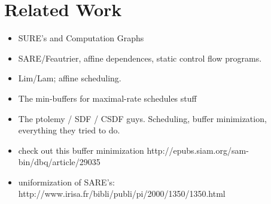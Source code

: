 \section{Related Work}

\begin{itemize}

\item SURE's and Computation Graphs

\item SARE/Feautrier, affine dependences, static control flow programs.

\item Lim/Lam; affine scheduling.

\item The min-buffers for maximal-rate schedules stuff

\item The ptolemy / SDF / CSDF guys.  Scheduling, buffer minimization,
everything they tried to do.

\item  check out this buffer minimization 
  http://epubs.siam.org/sam-bin/dbq/article/29035

\item uniformization of SARE's:
  http://www.irisa.fr/bibli/publi/pi/2000/1350/1350.html

\end{itemize}

